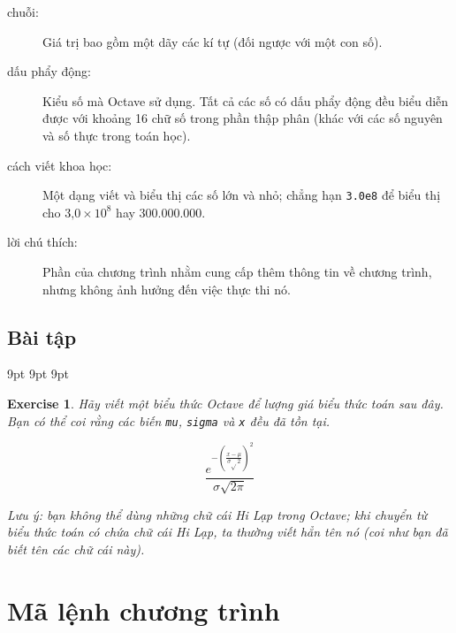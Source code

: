 \documentclass[12pt]{book}
\begin{document}
\begin{description}
\item[chuỗi:] Giá trị bao gồm một dãy các kí tự (đối ngược với một con số).

\item[dấu phẩy động:] Kiểu số mà Octave sử dụng. Tất cả các số có
dấu phẩy động đều biểu diễn được với khoảng 16 chữ số trong phần 
thập phân (khác với các số nguyên và số thực trong toán học).

\item[cách viết khoa học:] Một dạng viết và biểu thị các số lớn và nhỏ;
chẳng hạn {\tt 3.0e8} để biểu thị cho $\mbox{3,0} \times 10^8$
hay 300.000.000.  

\item[lời chú thích:] Phần của chương trình nhằm cung cấp thêm thông tin
về chương trình, nhưng không ảnh hưởng đến việc thực thi nó.

\end{description}


\section{Bài tập}

     {9pt}%
     {9pt}%
     {\itshape}%
     {}%
     {\bfseries}%
     {}%
     {9pt}%
     {}%


\theoremstyle{myex}
\newtheorem{ex}{Exercise}[chapter]

\begin{ex}
Hãy viết một biểu thức Octave để lượng giá biểu thức toán sau đây.
Bạn có thể coi rằng các biến {\tt mu}, {\tt sigma} và {\tt x} đều đã tồn tại.

\begin{equation}
\frac{e^{- \left( \frac{x-\mu}{\sigma \sqrt{}2} \right) ^2}}
{\sigma \sqrt{2 \pi}}
\end{equation}

Lưu ý: bạn không thể dùng những chữ cái Hi Lạp trong Octave; khi
chuyển từ biểu thức toán có chứa chữ cái Hi Lạp, ta thường viết hẳn 
tên nó (coi như bạn đã biết tên các chữ cái này).
\end{ex}
 

\chapter{Mã lệnh chương trình}
\end{document}

